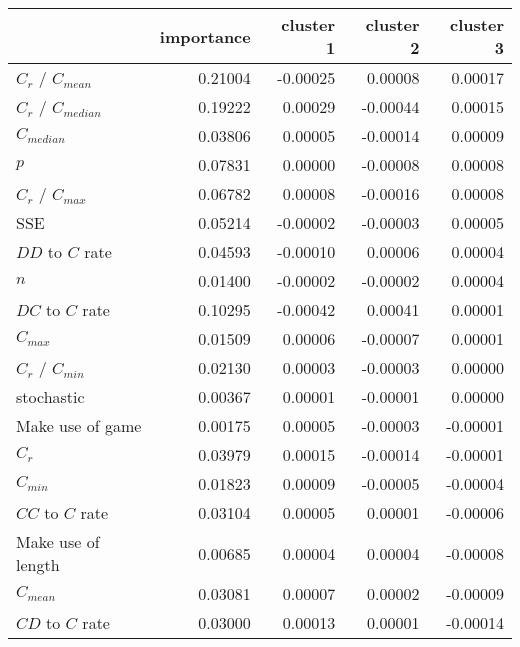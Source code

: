 \begin{tabular}{lrrrr}
\toprule
{} &  importance &  cluster 1 &  cluster 2 &  cluster 3 \\
\midrule
$C_r$ / $C_{mean}$   &     0.21004 &   -0.00025 &    0.00008 &    0.00017 \\
$C_r$ / $C_{median}$ &     0.19222 &    0.00029 &   -0.00044 &    0.00015 \\
$C_{median}$         &     0.03806 &    0.00005 &   -0.00014 &    0.00009 \\
$p$                  &     0.07831 &    0.00000 &   -0.00008 &    0.00008 \\
$C_r$ / $C_{max}$    &     0.06782 &    0.00008 &   -0.00016 &    0.00008 \\
SSE                  &     0.05214 &   -0.00002 &   -0.00003 &    0.00005 \\
$DD$ to $C$ rate     &     0.04593 &   -0.00010 &    0.00006 &    0.00004 \\
$n$                  &     0.01400 &   -0.00002 &   -0.00002 &    0.00004 \\
$DC$ to $C$ rate     &     0.10295 &   -0.00042 &    0.00041 &    0.00001 \\
$C_{max}$            &     0.01509 &    0.00006 &   -0.00007 &    0.00001 \\
$C_r$ / $C_{min}$    &     0.02130 &    0.00003 &   -0.00003 &    0.00000 \\
stochastic           &     0.00367 &    0.00001 &   -0.00001 &    0.00000 \\
Make use of game     &     0.00175 &    0.00005 &   -0.00003 &   -0.00001 \\
$C_r$                &     0.03979 &    0.00015 &   -0.00014 &   -0.00001 \\
$C_{min}$            &     0.01823 &    0.00009 &   -0.00005 &   -0.00004 \\
$CC$ to $C$ rate     &     0.03104 &    0.00005 &    0.00001 &   -0.00006 \\
Make use of length   &     0.00685 &    0.00004 &    0.00004 &   -0.00008 \\
$C_{mean}$           &     0.03081 &    0.00007 &    0.00002 &   -0.00009 \\
$CD$ to $C$ rate     &     0.03000 &    0.00013 &    0.00001 &   -0.00014 \\
\bottomrule
\end{tabular}

